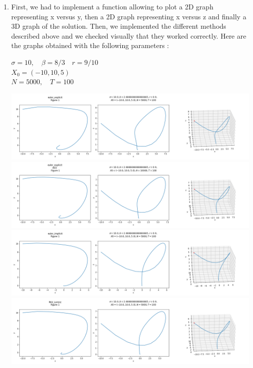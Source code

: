 \documentclass[12pt]{article}
\begin{document}
	\begin{enumerate}[label=\textbullet]
		\item First, we had to implement a function allowing to plot a 2D graph representing x versus y, then a 2D graph representing x versus z and finally a 3D graph of the solution. Then, we implemented the different methods described above and we checked visually that they worked correctly. Here are the graphs obtained with the following parameters :
		\begin{center}
			$\sigma=10,\quad \beta=8/3 \quad r=9/10$ \\
			$X_0=(-10,10,5)$ \\
			$N=5000, \quad T=100$
		\end{center}
		\includegraphics[width=\textwidth]{"images/euler_explicit.png"}
		\includegraphics[width=\textwidth]{"images/euler_explicit_dt2.png"}
		\includegraphics[width=\textwidth]{"images/euler_implicit.png"}
		\includegraphics[width=\textwidth]{"images/RK4_Lorenz.png"}

\end{enumerate}
\end{document}
